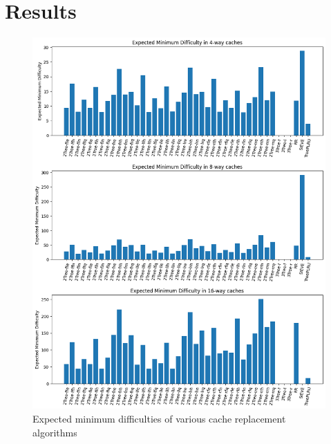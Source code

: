 \documentclass[letterpaper]{article}
\begin{document}
\section{Results}

\begin{figure}
	\begin{center}
		\includegraphics[scale=0.45]{minimum_difficulty}
	\end{center}
  \caption{Expected minimum difficulties of various cache replacement algorithms}
  \label{fig:expected_difficulties}
\end{figure}
\end{document}
